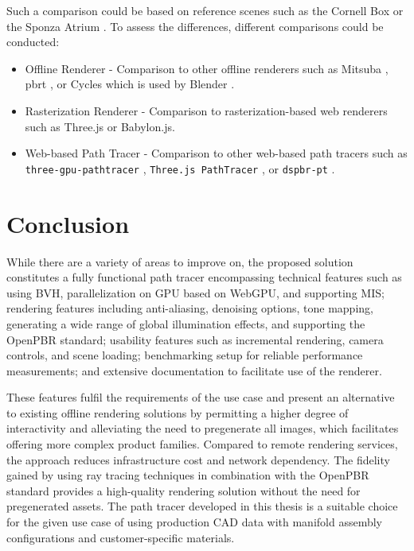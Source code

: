 Such a comparison could be based on reference scenes such as the Cornell Box \cite{goral1984modeling} or the Sponza Atrium \cite{dabrovic2002sponza}. To assess the differences, different comparisons could be conducted:

\begin{itemize}
  \item{Offline Renderer} - Comparison to other offline renderers such as Mitsuba \cite{Jakob2020DrJit}, \gls{pbrt} \cite{Pharr_Physically_Based_Rendering_2023}, or Cycles which is used by \gls{Blender} \cite{cycles}.
  \item{Rasterization Renderer} - Comparison to rasterization-based web renderers such as \gls{Three.js} or \gls{Babylon.js}.
  \item{Web-based Path Tracer} - Comparison to other web-based path tracers such as \texttt{three-gpu-pathtracer} \cite{ThreeJsPathTracerJohnson}, \texttt{Three.js PathTracer} \cite{ThreeJsPathTracerLoftis}, or \texttt{dspbr-pt} \cite{PathTracerDassault}.
\end{itemize}

\section{Conclusion}

While there are a variety of areas to improve on, the proposed solution constitutes a fully functional path tracer encompassing technical features such as using \gls{BVH}, parallelization on \gls{GPU} based on \gls{WebGPU}, and supporting \gls{MIS}; rendering features including anti-aliasing, denoising options, tone mapping, generating a wide range of global illumination effects, and supporting the \gls{OpenPBR} standard; usability features such as incremental rendering, camera controls, and scene loading; benchmarking setup for reliable performance measurements; and extensive documentation to facilitate use of the renderer.

These features fulfil the requirements of the use case and present an alternative to existing offline rendering solutions by permitting a higher degree of interactivity and alleviating the need to pregenerate all images, which facilitates offering more complex product families. Compared to remote rendering services, the approach reduces infrastructure cost and network dependency. The fidelity gained by using ray tracing techniques in combination with the \gls{OpenPBR} standard provides a high-quality rendering solution without the need for pregenerated assets. The path tracer developed in this thesis is a suitable choice for the given use case of using production \gls{CAD} data with manifold assembly configurations and customer-specific materials.

